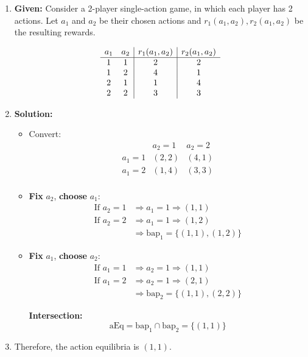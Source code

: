 \begin{example}
    \begin{enumerate}
        \item \textbf{Given:} Consider a 2-player single-action game, in which each player has 2 actions. Let $a_1$ and $a_2$ be their chosen actions and $r_1(a_1, a_2), r_2(a_1, a_2)$ be the resulting rewards. 
            
            \[
            \begin{array}{c c|c|c}
            a_1 & a_2 & r_1(a_1, a_2) & r_2(a_1, a_2) \\
            \hline
            1 & 1 & 2 & 2 \\
            1 & 2 & 4 & 1 \\
            2 & 1 & 1 & 4 \\
            2 & 2 & 3 & 3 \\
            \end{array}
            \]
        \item \textbf{Solution:} 
        \begin{itemize}
            \item Convert:
            \[
            \begin{array}{c|c|c}
            & a_2 = 1 & a_2 = 2 \\
            \hline
            a_1 = 1 & (2,2) & (4,1) \\
            a_1 = 2 & (1,4) & (3,3) \\
            \end{array}
            \]
            \item \textbf{Fix} $a_2$, \textbf{choose }$a_1$:
            \begin{align*}
            \text{If } a_2 = 1 &\Rightarrow a_1 = 1 \Rightarrow (1,1) \\
            \text{If } a_2 = 2 &\Rightarrow a_1 = 1 \Rightarrow (1,2) \\
            &\Rightarrow \text{bap}_1 = \{(1,1), (1,2)\}
            \end{align*}

            \item \textbf{Fix} $a_1$, \textbf{choose }$a_2$:
            \begin{align*}
            \text{If } a_1 = 1 &\Rightarrow a_2 = 1 \Rightarrow (1,1) \\
            \text{If } a_1 = 2 &\Rightarrow a_2 = 1 \Rightarrow (2,1) \\
            &\Rightarrow \text{bap}_2 = \{(1,1), (2,2)\}
            \end{align*}

            \noindent
            \textbf{Intersection:}
            \[
                \text{aEq} = \text{bap}_1 \cap \text{bap}_2 = \{(1,1)\}
            \]
        \end{itemize}
        \item Therefore, the action equilibria is $(1,1)$.
    \end{enumerate}

\end{example}
\newpage

